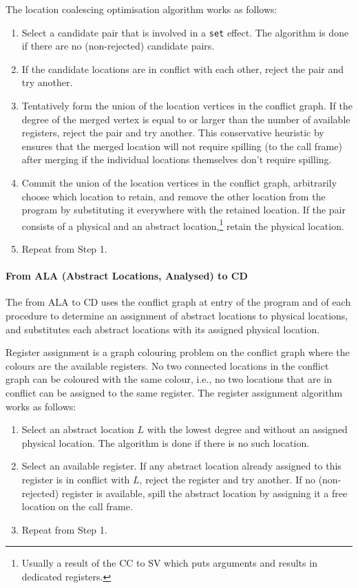 \documentclass[main.tex]{subfiles}
\begin{document}
The location coalescing optimisation algorithm works as follows:
\begin{enumerate}
	\item Select a candidate pair that is involved in a \texttt{set} effect. The algorithm is done if there are no (non-rejected) candidate pairs.
	\item If the candidate locations are in conflict with each other, reject the pair and try another.
	\item Tentatively form the union of the location vertices in the conflict graph. If the degree of the merged vertex is equal to or larger than the number of available registers, reject the pair and try another. This conservative heuristic by \citet{briggs} ensures that the merged location will not require spilling (to the call frame) after merging if the individual locations themselves don't require spilling.
	\item Commit the union of the location vertices in the conflict graph, arbitrarily choose which location to retain, and remove the other location from the program by substituting it everywhere with the retained location. If the pair consists of a physical and an abstract location,\footnote{Usually a result of the CC to SV  which puts arguments and results in dedicated registers.} retain the physical location.
	\item Repeat from Step 1.
\end{enumerate}

\paragraph{From ALA (Abstract Locations, Analysed) to CD} The  from ALA to CD uses the conflict graph at entry of the program and of each procedure to determine an assignment of abstract locations to physical locations, and substitutes each abstract locations with its assigned physical location.

Register assignment is a graph colouring problem on the conflict graph where the colours are the available registers. No two connected locations in the conflict graph can be coloured with the same colour, i.e., no two locations that are in conflict can be assigned to the same register. The register assignment algorithm works as follows:
\begin{enumerate}
	\item Select an abstract location $L$ with the lowest degree and without an assigned physical location. The algorithm is done if there is no such location.
	\item Select an available register. If any abstract location already assigned to this register is in conflict with $L$, reject the register and try another. If no (non-rejected) register is available, spill the abstract location by assigning it a free location on the call frame.
	\item Repeat from Step 1.
\end{enumerate}
\end{document}
